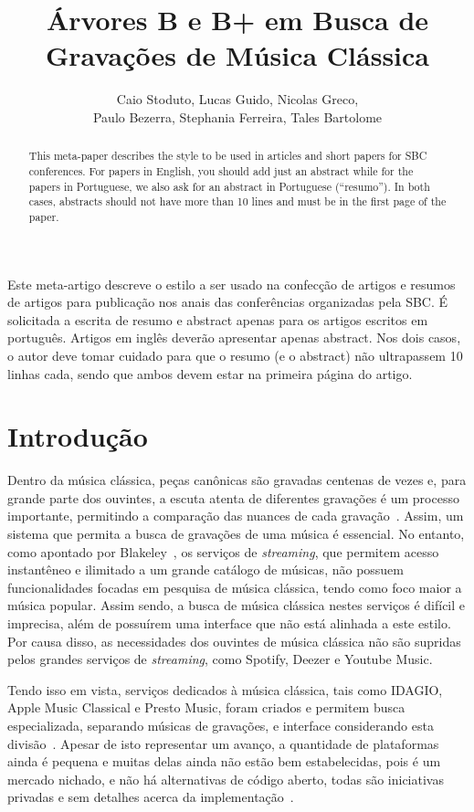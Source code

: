 \documentclass[12pt]{article}
\title{Árvores B e B\nolinebreak+ em Busca de Gravações de Música Clássica\\}
\author{Caio Stoduto\inst{1}, Lucas Guido\inst{1}, Nicolas Greco\inst{1},\\
Paulo Bezerra\inst{1}, Stephania Ferreira\inst{1}, Tales Bartolome\inst{1}}
\begin{document}
 

\maketitle

\begin{abstract}
  This meta-paper describes the style to be used in articles and short papers
  for SBC conferences. For papers in English, you should add just an abstract
  while for the papers in Portuguese, we also ask for an abstract in Portuguese
  (``resumo''). In both cases, abstracts should not have more than 10 lines and
  must be in the first page of the paper.
\end{abstract}
     
\begin{resumo} 
  Este meta-artigo descreve o estilo a ser usado na confecção de artigos e
  resumos de artigos para publicação nos anais das conferências organizadas pela
  SBC. É solicitada a escrita de resumo e abstract apenas para os artigos
  escritos em português. Artigos em inglês deverão apresentar apenas abstract.
  Nos dois casos, o autor deve tomar cuidado para que o resumo (e o abstract)
  não ultrapassem 10 linhas cada, sendo que ambos devem estar na primeira página
  do artigo.
\end{resumo}

\section{Introdução}
Dentro da música clássica, peças canônicas são gravadas centenas de vezes e,
para grande parte dos ouvintes, a escuta atenta de diferentes gravações é um
processo importante, permitindo a comparação das nuances de cada
gravação~\cite{Bl:25}. Assim, um sistema que permita a busca de gravações de uma
música é essencial. No entanto, como apontado por Blakeley~\cite{Bl:25}, os
serviços de \emph{streaming}, que permitem acesso instantêneo e ilimitado a um
grande catálogo de músicas, não possuem funcionalidades focadas em pesquisa de
música clássica, tendo como foco maior a música popular. Assim sendo, a busca de
música clássica nestes serviços é difícil e imprecisa, além de possuírem uma
interface que não está alinhada a este estilo. Por causa disso, as necessidades
dos ouvintes de música clássica não são supridas pelos grandes serviços de
\emph{streaming}, como Spotify, Deezer e Youtube Music.

Tendo isso em vista, serviços dedicados à música clássica, tais como IDAGIO,
Apple Music Classical e Presto Music, foram criados e permitem busca
especializada, separando músicas de gravações, e interface considerando esta
divisão~\cite{Bl:25}. Apesar de isto representar um avanço, a quantidade de
plataformas ainda é pequena e muitas delas ainda não estão bem estabelecidas,
pois é um mercado nichado, e não há alternativas de código aberto, todas são
iniciativas privadas e sem detalhes acerca da implementação~\cite{Bl:25}.
\end{document}
